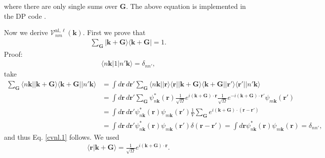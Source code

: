 where there are only single sums over $\mathbf{G}$. The above equation is implemented in the
DP code \cite{olevanoDP}.

Now we derive $\boldsymbol{\mathcal{V}}^{\mathrm{nl},\ell}_{nm}(\mathbf{k})$. First we prove that
\begin{align}\label{cvnl.1}
\sum_{\mathbf{G}}
\vert\mathbf{k}+\mathbf{G}\rangle\langle\mathbf{k}+\mathbf{G}\vert
=1
.
\end{align}
\noindent Proof:
\begin{align}\label{cvnl.2}
\langle n\mathbf{k}\vert 1\vert n'\mathbf{k}\rangle=\delta_{nn'}
,
\end{align}
take
\begin{align}\label{cvnl.3}
\sum_\mathbf{G} \langle n\mathbf{k}\vert \vert\mathbf{k}+\mathbf{G}\rangle\langle\mathbf{k}+\mathbf{G}\vert\vert n'\mathbf{k}\rangle
&=
\int d\mathbf{r}\,d\mathbf{r}' 
\sum_\mathbf{G} \langle n\mathbf{k}\vert 
\vert\mathbf{r}\rangle\langle\mathbf{r}\vert
\vert\mathbf{k}+\mathbf{G}\rangle\langle\mathbf{k}+\mathbf{G}\vert
\vert\mathbf{r}'\rangle\langle\mathbf{r}'\vert
\vert n'\mathbf{k}\rangle
\nonumber\\
&=
\int d\mathbf{r}\,d\mathbf{r}' 
\sum_\mathbf{G} 
\psi^{*}_{n\mathbf{k}}(\mathbf{r}) 
\frac{1}{\sqrt{\Omega}}e^{i(\mathbf{k}+\mathbf{G})\cdot\mathbf{r}}
\frac{1}{\sqrt{\Omega}}e^{-i(\mathbf{k}+\mathbf{G})\cdot\mathbf{r}'}
\psi_{m\mathbf{k}}(\mathbf{r}') 
\nonumber\\
&=
\int d\mathbf{r}\,d\mathbf{r}' 
\psi^{*}_{n\mathbf{k}}(\mathbf{r}) 
\psi_{m\mathbf{k}}(\mathbf{r}') 
\frac{1}{V}
\sum_\mathbf{G} 
e^{i(\mathbf{k}+\mathbf{G})\cdot(\mathbf{r}-\mathbf{r}')}
\nonumber\\
&=
\int d\mathbf{r}\,d\mathbf{r}' 
\psi^{*}_{n\mathbf{k}}(\mathbf{r}) 
\psi_{m\mathbf{k}}(\mathbf{r}') 
\delta(\mathbf{r}-\mathbf{r}')
=
\int d\mathbf{r}
\psi^{*}_{n\mathbf{k}}(\mathbf{r}) 
\psi_{m\mathbf{k}}(\mathbf{r})=\delta_{nn'} ,
\end{align}
and thus Eq. \eqref{cvnl.1} follows. We used
\begin{align}\label{vnl.4}
\langle\mathbf{r}\vert\mathbf{k}+\mathbf{G}\rangle=\frac{1}{\sqrt{\Omega}}e^{i(\mathbf{k}+\mathbf{G})\cdot\mathbf{r}}.
\end{align}

